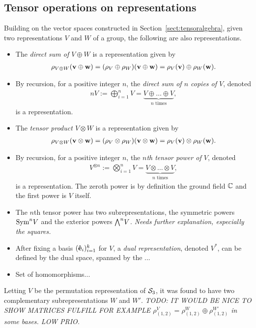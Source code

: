 \subsection{Tensor operations on representations}\label{sect:tensorrepr}

Building on the vector spaces constructed in Section~\ref{sect:tensoralgebra}, given two representations $V$ and $W$ of a group, the following are also representations.

\begin{itemize}
	\item The \emph{direct sum of $V \oplus W$} is a representation given by 
	\begin{align*}
		\rho_{V \oplus W}(\mathbf{v} \oplus \mathbf{w}) = (\rho_V \oplus \rho_W)(\mathbf{v} \oplus \mathbf{w}) = \rho_V(\mathbf{v}) \oplus \rho_W(\mathbf{w}).
	\end{align*}
	
	\item By recursion, for a positive integer $n$, the \emph{direct sum of $n$ copies of $V$}, denoted
	\begin{align*}
		nV := \bigoplus_{i=1}^n V = \underset{\text{$n$ times}}{\underbrace{V \oplus \dots \oplus V}},
	\end{align*}
	is a representation.
	
	\item The \emph{tensor product $V \otimes W$} is a representation given by
	\begin{align*}
		\rho_{V \otimes W}(\mathbf{v} \otimes \mathbf{w}) = (\rho_V \otimes \rho_W)(\mathbf{v} \otimes \mathbf{w}) = \rho_V(\mathbf{v}) \otimes \rho_W(\mathbf{w}).
	\end{align*}
	
	\item By recursion, for a positive integer $n$, the \emph{$n$th tensor power of $V$}, denoted
	\begin{align*}
		V^{\otimes n} := \bigotimes_{i=1}^n V = \underset{\text{$n$ times}}{\underbrace{V \otimes \dots \otimes V}},
	\end{align*}
	is a representation. The zeroth power is by definition the ground field $\mathbb{C}$ and the first power is $V$ itself.
	
	\item The $n$th tensor power has two subrepresentations, the symmetric powers $\text{Sym}^n V$ and the exterior powers ${\bigwedge}^n V$. \textit{Needs further explanation, especially the squares.}
	
	\item After fixing a basis $(\mathbf{\hat{e}}_i)_{i=1}^k$ for $V$, a \emph{dual representation}, denoted $V^*$, can be defined by the dual space, spanned by the ...
	
	\item Set of homomorphisms...
\end{itemize}


\begin{example}
	Letting $V$ be the permutation representation of $\mathcal{S}_3$, it was found to have two complementary subrepresentations $W$ and $W'$. \textit{TODO: IT WOULD BE NICE TO SHOW MATRICES FULFILL FOR EXAMPLE $\rho_{(1,2)}^V = \rho_{(1,2)}^W \oplus \rho_{(1,2)}^{W'}$ in some bases. LOW PRIO.}
\end{example}